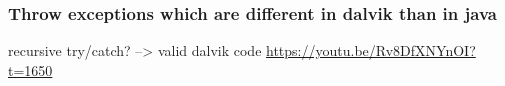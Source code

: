 \subsubsection{Throw exceptions which are different in dalvik than in java}\label{subsubsection:counter-reengineering-break-exception}
recursive try/catch? --> valid dalvik code\newline
\url{https://youtu.be/Rv8DfXNYnOI?t=1650}
